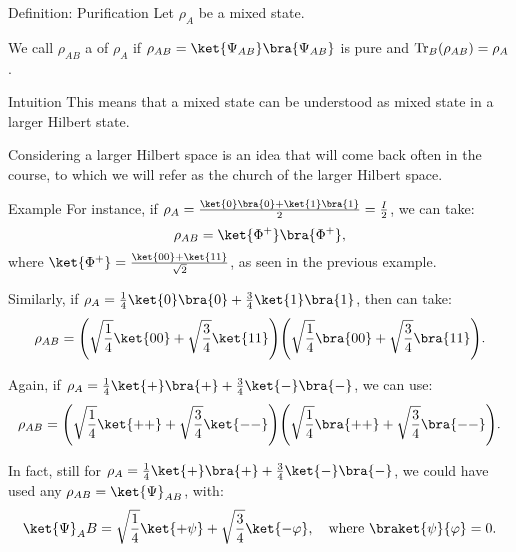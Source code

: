 \documentclass[a4paper]{article}
\begin{document}
\begin{parag}{Definition: Purification}
    Let $\rho_{A}$ be a mixed state.

    We call $\rho_{AB}$ a  of $\rho_A$ if $\rho_{AB} = \ket{\Psi_{AB}}\bra{\Psi_{AB}}$ is pure and $\Tr_B\left(\rho_{AB}\right) = \rho_A$.

    \begin{subparag}{Intuition}
        This means that a mixed state can be understood as mixed state in a larger Hilbert state.

        Considering a larger Hilbert space is an idea that will come back often in the course, to which we will refer as the church of the larger Hilbert space.
    \end{subparag}

    \begin{subparag}{Example}
        For instance, if $\rho_A = \frac{\ket{0}\bra{0} + \ket{1}\bra{1}}{2} = \frac{I}{2}$, we can take:
        \[\rho_{AB} = \ket{\Phi^+}\bra{\Phi^+},\]
        where $\ket{\Phi^+} = \frac{\ket{00} + \ket{11}}{\sqrt{2}}$, as seen in the previous example.

        Similarly, if $\rho_A = \frac{1}{4} \ket{0}\bra{0} + \frac{3}{4} \ket{1}\bra{1}$, then can take: 
        \[\rho_{AB} = \left(\sqrt{\frac{1}{4}}\ket{00} + \sqrt{\frac{3}{4}} \ket{11}\right)\left(\sqrt{\frac{1}{4}} \bra{00} + \sqrt{\frac{3}{4}} \bra{11}\right).\]

        Again, if $\rho_{A} = \frac{1}{4} \ket{+}\bra{+} + \frac{3}{4} \ket{-}\bra{-}$, we can use: 
        \[\rho_{AB} = \left(\sqrt{\frac{1}{4}} \ket{++} + \sqrt{\frac{3}{4}} \ket{--}\right)\left(\sqrt{\frac{1}{4}} \bra{++} + \sqrt{\frac{3}{4}} \bra{--}\right).\]
        
        In fact, still for $\rho_{A} = \frac{1}{4} \ket{+}\bra{+} + \frac{3}{4} \ket{-}\bra{-}$, we could have used any $\rho_{AB} = \ket{\Psi}_{AB}$, with: 
        \[\ket{\Psi}_AB = \sqrt{\frac{1}{4}} \ket{+ \psi} + \sqrt{\frac{3}{4}} \ket{- \phi}, \mathspace \text{where } \braket{\psi}{\phi} = 0.\]
    \end{subparag}
\end{parag}
\end{document}

